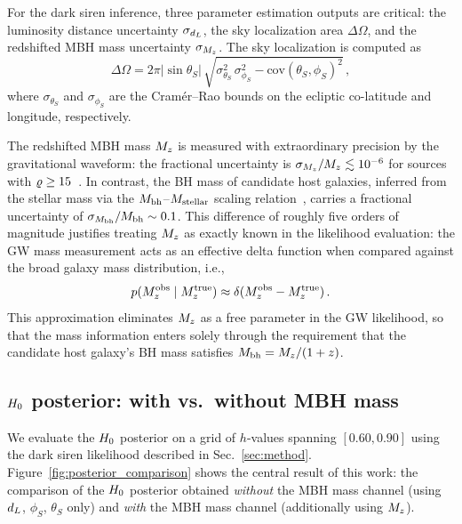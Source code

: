For the dark siren inference, three parameter estimation outputs are
critical: the luminosity distance uncertainty $\sigma_{d_L}$, the sky
localization area $\Delta\Omega$, and the redshifted MBH mass uncertainty
$\sigma_{M_z}$. The sky localization is computed as
\begin{equation}
  \Delta\Omega = 2\pi |\sin\theta_S| \,
  \sqrt{\sigma_{\theta_S}^2 \, \sigma_{\phi_S}^2
    - \mathrm{cov}(\theta_S, \phi_S)^2} \,,
  \label{eq:sky_localization}
\end{equation}
where $\sigma_{\theta_S}$ and $\sigma_{\phi_S}$ are the
Cram\'{e}r--Rao bounds on the ecliptic co-latitude and longitude,
respectively.

The redshifted MBH mass $M_z$ is measured with extraordinary precision
by the gravitational waveform: the fractional uncertainty is
$\sigma_{M_z}/M_z \lesssim 10^{-6}$ for sources with
$\varrho \geq 15$~\cite{Babak:2017tow}. In contrast, the BH mass of
candidate host galaxies, inferred from the stellar mass via the
$M_\mathrm{bh}$--$M_\mathrm{stellar}$ scaling relation~\cite{Reines:2015moa}, carries a
fractional uncertainty of $\sigma_{M_\mathrm{bh}}/M_\mathrm{bh} \sim 0.1$. This
difference of roughly five orders of magnitude justifies treating
$M_z$ as exactly known in the likelihood evaluation: the GW mass
measurement acts as an effective delta function when compared against the
broad galaxy mass distribution, i.e.,
\begin{equation}
  p(M_z^\mathrm{obs} \mid M_z^\mathrm{true})
  \approx \delta(M_z^\mathrm{obs} - M_z^\mathrm{true}) \,.
  \label{eq:delta_mass}
\end{equation}
This approximation eliminates $M_z$ as a free parameter in the GW
likelihood, so that the mass information enters solely through the
requirement that the candidate host galaxy's BH mass satisfies
$M_\mathrm{bh} = M_z / (1+z)$.

\subsection{$H_0$ posterior: with vs.\ without MBH mass}
\label{sec:h0_posterior}

We evaluate the $H_0$ posterior on a grid of $h$-values spanning
$[0.60, 0.90]$ using the dark siren likelihood described in
Sec.~\ref{sec:method}. Figure~\ref{fig:posterior_comparison} shows the
central result of this work: the comparison of the $H_0$ posterior
obtained \emph{without} the MBH mass channel (using $d_L$, $\phi_S$,
$\theta_S$ only) and \emph{with} the MBH mass channel (additionally
using $M_z$).

